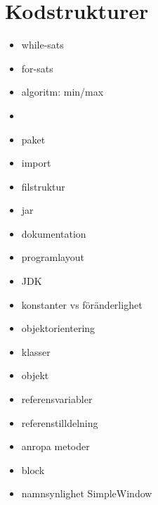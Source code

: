 \chapter{Kodstrukturer}
\begin{itemize}[nosep]
\item while-sats
\item for-sats
\item algoritm: min/max
\item 
\item paket
\item import
\item filstruktur
\item jar
\item dokumentation
\item programlayout
\item JDK
\item konstanter vs föränderlighet
\item objektorientering
\item klasser
\item objekt
\item referensvariabler
\item referenstilldelning
\item anropa metoder
\item block
\item namnsynlighet SimpleWindow\end{itemize}